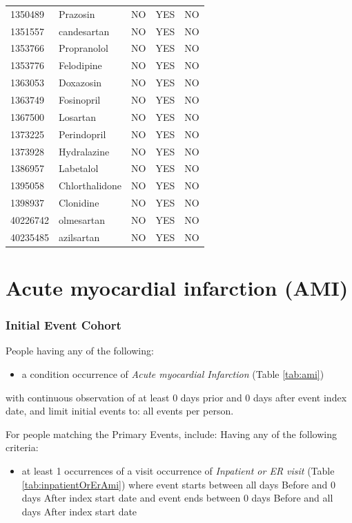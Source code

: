 \documentclass[11pt]{book}
\providecommand{\tightlist}{%
  \setlength{\itemsep}{0pt}\setlength{\parskip}{0pt}}
\theoremstyle{definition}
\theoremstyle{definition}
\theoremstyle{definition}
\theoremstyle{remark}
\begin{document}
\begin{longtable}[]{@{}lllll@{}}
1350489 & Prazosin & NO & YES & NO\tabularnewline
1351557 & candesartan & NO & YES & NO\tabularnewline
1353766 & Propranolol & NO & YES & NO\tabularnewline
1353776 & Felodipine & NO & YES & NO\tabularnewline
1363053 & Doxazosin & NO & YES & NO\tabularnewline
1363749 & Fosinopril & NO & YES & NO\tabularnewline
1367500 & Losartan & NO & YES & NO\tabularnewline
1373225 & Perindopril & NO & YES & NO\tabularnewline
1373928 & Hydralazine & NO & YES & NO\tabularnewline
1386957 & Labetalol & NO & YES & NO\tabularnewline
1395058 & Chlorthalidone & NO & YES & NO\tabularnewline
1398937 & Clonidine & NO & YES & NO\tabularnewline
40226742 & olmesartan & NO & YES & NO\tabularnewline
40235485 & azilsartan & NO & YES & NO\tabularnewline
\bottomrule
\end{longtable}

\hypertarget{Ami}{%
\section{Acute myocardial infarction (AMI)}\label{Ami}}

\hypertarget{initial-event-cohort-2}{%
\subsubsection*{Initial Event Cohort}\label{initial-event-cohort-2}}

People having any of the following:

\begin{itemize}
\tightlist
\item
  a condition occurrence of \emph{Acute myocardial Infarction} (Table \ref{tab:ami})
\end{itemize}

with continuous observation of at least 0 days prior and 0 days after event index date, and limit initial events to: all events per person.

For people matching the Primary Events, include: Having any of the following criteria:

\begin{itemize}
\tightlist
\item
  at least 1 occurrences of a visit occurrence of \emph{Inpatient or ER visit} (Table \ref{tab:inpatientOrErAmi}) where event starts between all days Before and 0 days After index start date and event ends between 0 days Before and all days After index start date
\end{itemize}
\end{document}
